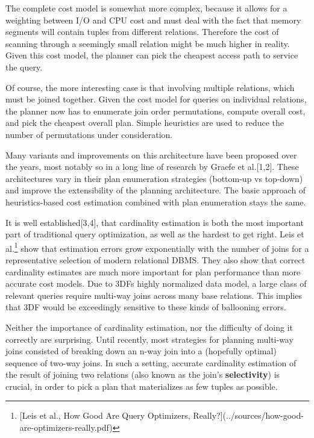 \documentclass[../index.tex]{subfiles}
\begin{document}
The complete cost model is somewhat more complex, because it allows
for a weighting between I/O and CPU cost and must deal with the fact
that memory segments will contain tuples from different
relations. Therefore the cost of scanning through a seemingly small
relation might be much higher in reality. Given this cost model, the
planner can pick the cheapest access path to service the query.

Of course, the more interesting case is that involving multiple
relations, which must be joined together. Given the cost model for
queries on individual relations, the planner now has to enumerate join
order permutations, compute overall cost, and pick the cheapest
overall plan. Simple heuristics are used to reduce the number of
permutations under consideration.

Many variants and improvements on this architecture have been proposed
over the years, most notably so in a long line of research by Graefe
et al.[1,2]. These architectures vary in their plan enumeration
strategies (bottom-up vs top-down) and improve the extensibility of
the planning architecture. The basic approach of heuristics-based cost
estimation combined with plan enumeration stays the same.

It is well established[3,4], that cardinality estimation is both the
most important part of traditional query optimization, as well as the
hardest to get right. Leis et al.\footnote{[Leis et al., How Good Are Query Optimizers, Really?](../sources/how-good-are-optimizers-really.pdf)} show that estimation errors grow
exponentially with the number of joins for a representative selection
of modern relational DBMS. They also show that correct cardinality
estimates are much more important for plan performance than more
accurate cost models. Due to 3DFs highly normalized data model, a
large class of relevant queries require multi-way joins across many
base relations. This implies that 3DF would be exceedingly sensitive
to these kinds of ballooning errors.

Neither the importance of cardinality estimation, nor the difficulty
of doing it correctly are surprising. Until recently, most strategies
for planning multi-way joins consisted of breaking down an n-way join
into a (hopefully optimal) sequence of two-way joins. In such a
setting, accurate cardinality estimation of the result of joining two
relations (also known as the join's \textbf{selectivity}) is crucial, in
order to pick a plan that materializes as few tuples as possible.
\end{document}
